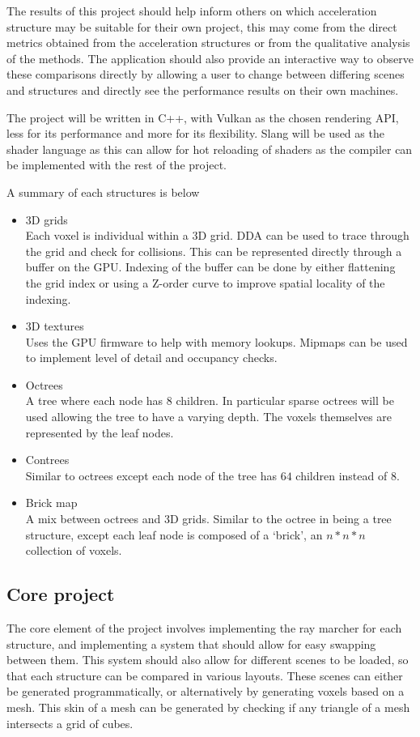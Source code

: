 The results of this project should help inform others on which
acceleration structure may be suitable for their own project, this
may come from the direct metrics obtained from the acceleration
structures or from the qualitative analysis of the methods.
The application should also provide an interactive way to observe these
comparisons directly by allowing a user to change between differing scenes
and structures and directly see the performance results on their own machines.

The project will be written in C++, with Vulkan as the chosen rendering API,
less for its performance and more for its flexibility.
Slang will be used as the shader language as this can allow for hot reloading
of shaders as the compiler can be implemented with the rest of the project.

A summary of each structures is below
\begin{itemize}[noitemsep]
  \item 3D grids \\
    Each voxel is individual within a 3D grid. DDA can be used to
    trace through the grid and check for collisions. This can be
    represented directly through a buffer on the GPU. Indexing of the buffer
    can be done by either flattening the grid index or using a Z-order curve
    to improve spatial locality of the indexing.
  \item 3D textures \\
    Uses the GPU firmware to help with memory lookups. Mipmaps
    can be used to implement level of detail and occupancy checks.
  \item Octrees \\
    A tree where each node has 8 children. In particular sparse octrees will be
    used allowing the tree to have a varying depth. The voxels themselves are
    represented by the leaf nodes.
  \item Contrees \\
    Similar to octrees except each node of the tree has $64$ children
    instead of $8$.
  \item Brick map \\
    A mix between octrees and 3D grids. Similar to the octree in
    being a tree structure, except each leaf node is composed of a `brick', an
    $n*n*n$ collection of voxels.
\end{itemize}

\subsection*{Core project}
The core element of the project involves implementing the ray marcher
for each structure, and implementing a system that should allow
for easy swapping between them. This system should also allow for different
scenes to be loaded, so that each structure can be compared in various layouts.
These scenes can either be generated programmatically, or
alternatively by generating voxels based on a mesh. This skin of a mesh can
be generated by checking if any triangle of a mesh intersects a grid of cubes.

